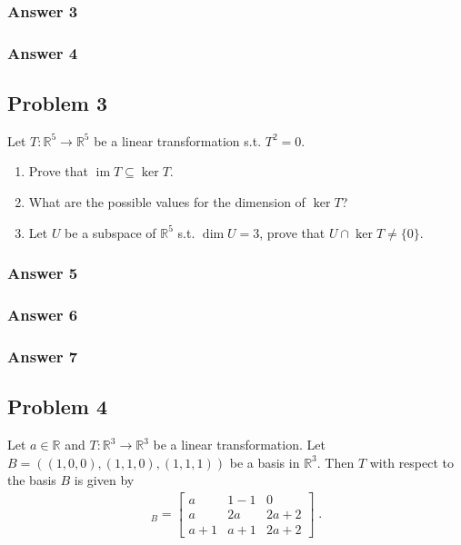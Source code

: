 \documentclass[11pt]{article}
\DeclareMathOperator{\image}{\mathrm{im}}
\begin{document}
\subsubsection{Answer 3}
\label{sec-1-2-1}

\subsubsection{Answer 4}
\label{sec-1-2-2}

\subsection{Problem 3}
\label{sec-1-3}
Let $T: \mathbb{R}^5 \to \mathbb{R}^5$ be a linear transformation s.t. $T^2 =
   0$.
\begin{enumerate}
\item Prove that $\image T \subseteq \ker T$.
\item What are the possible values for the dimension of $\ker T$?
\item Let $U$ be a subspace of $\mathbb{R}^5$ s.t. $\dim U = 3$, prove that $U
      \cap \ker T \neq \{0\}$.
\end{enumerate}

\subsubsection{Answer 5}
\label{sec-1-3-1}

\subsubsection{Answer 6}
\label{sec-1-3-2}

\subsubsection{Answer 7}
\label{sec-1-3-3}

\subsection{Problem 4}
\label{sec-1-4}
Let $a \in \mathbb{R}$ and $T:\mathbb{R}^3 \to \mathbb{R}^3$ be a linear
transformation.  Let $B = ((1,0,0),(1,1,0),(1,1,1))$ be a basis in
$\mathbb{R}^3$.  Then $T$ with respect to the basis $B$ is given by
\begin{align*}
  [T]_B = \begin{bmatrix}
    a     & 1 - 1 & 0 \\
    a     & 2a    & 2a + 2 \\
    a + 1 & a + 1 & 2a + 2
  \end{bmatrix} \;.
\end{align*}
\end{document}

